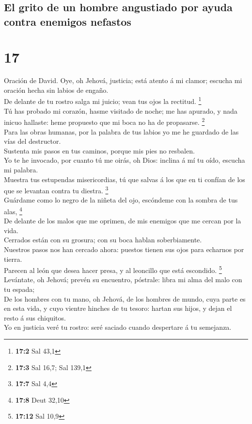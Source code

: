 \hypertarget{el-grito-de-un-hombre-angustiado-por-ayuda-contra-enemigos-nefastos}{%
\subsection{El grito de un hombre angustiado por ayuda contra enemigos
nefastos}\label{el-grito-de-un-hombre-angustiado-por-ayuda-contra-enemigos-nefastos}}

\hypertarget{section-16}{%
\section{17}\label{section-16}}

 Oración de David. Oye, oh Jehová, justicia; está atento á
mi clamor; escucha mi oración hecha sin labios de engaño.\\
 De delante de tu rostro salga mi juicio; vean tus ojos la
rectitud. \footnote{\textbf{17:2} Sal 43,1}\\
 Tú has probado mi corazón, hasme visitado de noche; me
has apurado, y nada inicuo hallaste: heme propuesto que mi boca no ha de
propasarse. \footnote{\textbf{17:3} Sal 16,7; Sal 139,1}\\
 Para las obras humanas, por la palabra de tus labios yo
me he guardado de las vías del destructor.\\
 Sustenta mis pasos en tus caminos, porque mis pies no
resbalen.\\
 Yo te he invocado, por cuanto tú me oirás, oh Dios:
inclina á mí tu oído, escucha mi palabra.\\
 Muestra tus estupendas misericordias, tú que salvas á los
que en ti confían de los que se levantan contra tu diestra.
\footnote{\textbf{17:7} Sal 4,4}\\
 Guárdame como lo negro de la niñeta del ojo, escóndeme
con la sombra de tus alas, \footnote{\textbf{17:8} Deut 32,10}\\
 De delante de los malos que me oprimen, de mis enemigos
que me cercan por la vida.\\
 Cerrados están con su grosura; con su boca hablan
soberbiamente.\\
 Nuestros pasos nos han cercado ahora: puestos tienen sus
ojos para echarnos por tierra.\\
 Parecen al león que desea hacer presa, y al leoncillo
que está escondido. \footnote{\textbf{17:12} Sal 10,9}\\
 Levántate, oh Jehová; prevén su encuentro, póstrale:
libra mi alma del malo con tu espada;\\
 De los hombres con tu mano, oh Jehová, de los hombres de
mundo, cuya parte es en esta vida, y cuyo vientre hinches de tu tesoro:
hartan sus hijos, y dejan el resto á sus chiquitos.\\
 Yo en justicia veré tu rostro: seré saciado cuando
despertare á tu semejanza.

